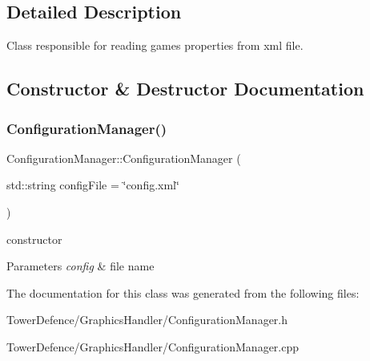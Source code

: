 \subsection{Detailed Description}
Class responsible for reading game\textquotesingle{}s properties from xml file. 

\subsection{Constructor \& Destructor Documentation}
\mbox{\label{class_configuration_manager_aee85c207758968e5ce0c291383aa51f6}} 
\subsubsection{\texorpdfstring{Configuration\+Manager()}{ConfigurationManager()}}
{\footnotesize\ttfamily Configuration\+Manager\+::\+Configuration\+Manager (\begin{DoxyParamCaption}\item[{std\+::string}]{config\+File = {\ttfamily \char`\"{}config.xml\char`\"{}} }\end{DoxyParamCaption})}



constructor 


\begin{DoxyParams}{Parameters}
{\em config} & file name \\
\hline
\end{DoxyParams}


The documentation for this class was generated from the following files\+:\begin{DoxyCompactItemize}
\item 
Tower\+Defence/\+Graphics\+Handler/Configuration\+Manager.\+h\item 
Tower\+Defence/\+Graphics\+Handler/Configuration\+Manager.\+cpp\end{DoxyCompactItemize}
